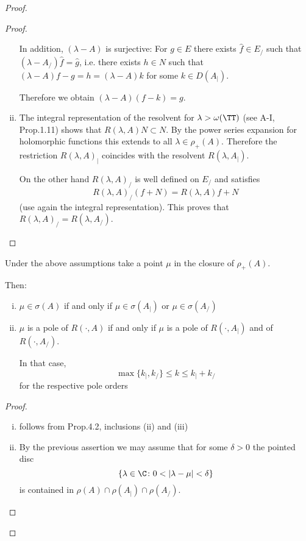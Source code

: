 \begin{proof}
\begin{proof}
\begin{enumerate}[(i)]
\newpage

In addition, $(\lambda-A)$ is surjective: For $g \in E$ there exists $\hat{f} \in E_{/}$ such that $(\lambda-A_{/})\hat{f} = \hat{g}$, i.e. there exists $h \in N$ such that $(\lambda-A)f - g = h = (\lambda-A)k$ for some $k \in D(A_{|})$.

Therefore we obtain $(\lambda-A)(f-k) = g$.

\item The integral representation of the resolvent for $\lambda > \omega(\TT)$ (see A-I, Prop.1.11) shows that $R(\lambda,A)N \subset N$.
By the power series expansion for holomorphic functions this extends to all $\lambda \in \rho_{+}(A)$.
Therefore the restriction $R(\lambda,A)_{|}$ coincides with the resolvent $R(\lambda,A_{|})$.

On the other hand $R(\lambda,A)_{/}$ is well defined on $E_{/}$ and satisfies
\[
R(\lambda,A)_{/}(f+N) = R(\lambda,A)f + N
\]
(use again the integral representation).
This proves that $R(\lambda,A)_{/} = R(\lambda,A_{/})$.
\end{enumerate}
\end{proof}

\begin{corollary}\label{cor:a3-4.3}

Under the above assumptions take a point $\mu$ in the closure of $\rho_{+}(A)$.

Then:
\begin{enumerate}[(i)]
\item $\mu \in \sigma(A)$ if and only if $\mu \in \sigma(A_{|})$ or $\mu \in \sigma(A_{/})$

\item $\mu$ is a pole of $R(\cdot,A)$ if and only if $\mu$ is a pole of $R(\cdot,A_{|})$ and of $R(\cdot,A_{/})$.

In that case,
\[
\max\{k_{|},k_{/}\} \leq k \leq k_{|} + k_{/}
\]
for the respective pole orders
\end{enumerate}
\end{corollary}

\begin{proof}
\begin{enumerate}[(i)]
\item follows from Prop.4.2, inclusions (ii) and (iii)

\item By the previous assertion we may assume that for some $\delta > 0$ the pointed disc
\[
\{\lambda \in \C \colon 0 < |\lambda-\mu| < \delta\}
\]
is contained in $\rho(A) \cap \rho(A_{|}) \cap \rho(A_{/})$.


\end{enumerate}
\end{proof}
\end{proof}
